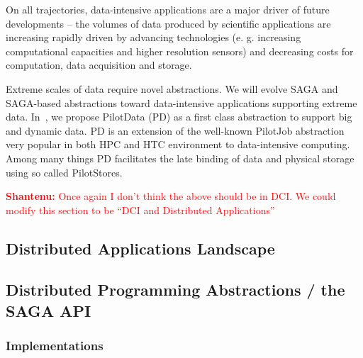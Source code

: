 \documentclass{article}
\newcommand{\B}[1]{\textbf{#1}}
\newcommand{\jhanote}[1]{{\textcolor{red}{     \B{Shantenu:} #1 }}}
\newcommand{\jhanote}[1]{}
\begin{document}
  On all trajectories, data-intensive applications are a major driver of future
  developments -- the volumes of data produced by scientific applications are
  increasing rapidly driven by advancing technologies (e. g. increasing
  computational capacities and higher resolution sensors) and decreasing costs
  for computation, data acquisition and storage.

  Extreme scales of data require novel abstractions. We will evolve SAGA and
  SAGA-based abstractions toward data-intensive applications supporting extreme
  data.  In~\cite{troy-2011}, we propose PilotData (PD) as a first class
  abstraction to support big and dynamic data. PD is an extension of the
  well-known PilotJob abstraction very popular in both HPC and HTC environment
  to data-intensive computing.  Among many things PD facilitates the late
  binding of data and physical storage using so called PilotStores.

  \jhanote{Once again I don't think the above should be in DCI. We could modify
  this section to be ``DCI and Distributed Applications''}

 \subsection{Distributed Applications Landscape}
 
 \subsection{Distributed Programming Abstractions / the SAGA API}

 \subsubsection{Implementations}

\end{document}
